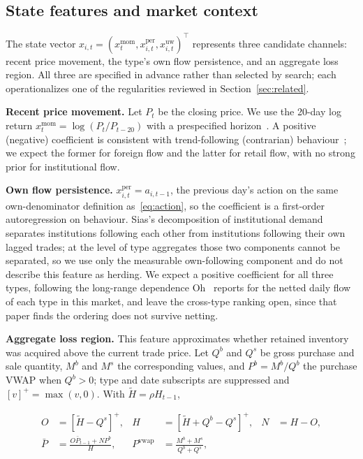 \subsection{State features and market context}
\label{sec:method-features}

The state vector $x_{i,t} = (x^{\mathrm{mom}}_{t}, x^{\mathrm{per}}_{i,t},
x^{\mathrm{uw}}_{i,t})^{\top}$ represents three candidate channels:
recent price movement, the type's own flow persistence, and an aggregate
loss region. All three are specified in advance rather than selected by
search; each operationalizes one of the regularities reviewed in
Section~\ref{sec:related}.

\textbf{Recent price movement.} Let $P_t$ be the closing price. We use
the 20-day log return $x^{\mathrm{mom}}_t = \log(P_t / P_{t-20})$ with a
prespecified horizon~\cite{jegadeesh_titman}. A positive (negative)
coefficient is consistent with trend-following (contrarian)
behaviour~\cite{choe_kho_stulz,grinblatt_keloharju2001}; we expect the
former for foreign flow and the latter for retail flow, with no strong
prior for institutional flow.

\textbf{Own flow persistence.} $x^{\mathrm{per}}_{i,t} = a_{i,t-1}$, the
previous day's action on the same own-denominator definition
as~\eqref{eq:action}, so the coefficient is a first-order autoregression
on behaviour. Sias's decomposition of institutional
demand~\cite{sias2004} separates institutions following each other from
institutions following their own lagged trades; at the level of type
aggregates those two components cannot be separated, so we use only the
measurable own-following component and do not describe this feature as
herding. We expect a positive coefficient for all three types, following
the long-range dependence Oh~\cite{oh2025} reports for the netted daily
flow of each type in this market, and leave the cross-type ranking open,
since that paper finds the ordering does not survive netting.

\textbf{Aggregate loss region.} This feature approximates whether
retained inventory was acquired above the current trade price. Let $Q^b$
and $Q^s$ be gross purchase and sale quantity, $M^b$ and $M^s$ the
corresponding values, and $P^b = M^b / Q^b$ the purchase VWAP when
$Q^b > 0$; type and date subscripts are suppressed and
$[v]^{+} = \max(v, 0)$. With $\tilde H = \rho H_{t-1}$,

\begin{equation}
  \label{eq:underwater}
  \begin{aligned}
    O &= [\tilde H - Q^s]^{+}, &
    H &= [\tilde H + Q^b - Q^s]^{+}, &
    N &= H - O, \\
    \bar P &= \frac{O \bar P_{t-1} + N P^b}{H}, &
    P^{\mathrm{vwap}} &= \frac{M^b + M^s}{Q^b + Q^s},
  \end{aligned}
\end{equation}

